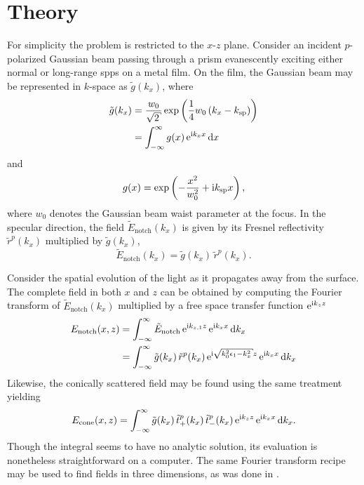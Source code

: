 \section{Theory}\label{sec:interferencetheory}
For simplicity the problem is restricted to the $x$-$z$ plane.  Consider an
incident $p$-polarized Gaussian beam passing through a prism evanescently
exciting either normal or long-range \glspl{spp} on a metal film.  On the film,
the Gaussian beam may be represented in $k$-space as $\tilde{g}(k_x)$,
where
\begin{align}
  \tilde{g}(k_x) & = \frac{w_0}{\sqrt{2}} \exp\left(\frac{1}{4}w_0\left(k_x - \ksp\right)\right) \\
                 & = \intinfty g(x)\, \me^{\mi k_x x} \md x
\end{align}
and
\begin{equation}
  g(x) = \exp\left(-\frac{x^2}{w_0^2} + {\mathrm{i}} k_\mathrm{sp} x\right),
\end{equation}
where $w_0$ denotes the Gaussian beam waist parameter at the focus.  In the
specular direction, the field $\tilde{E}_\mathrm{notch}(k_x)$ is given by its
Fresnel reflectivity $\tilde{r}^p(k_x)$ multiplied by $\tilde{g}(k_x)$,
\begin{equation}
  \tilde{E}_\mathrm{notch}(k_x)=\tilde{g}(k_x)\,\tilde{r}^p(k_x).
\end{equation}

Consider the spatial evolution of the light as it propagates
away from the surface.
The complete field in both $x$ and $z$ can be obtained by computing
the Fourier transform of $\tilde{E}_\mathrm{notch}(k_x)$ multiplied
by a free space transfer function ${\mathrm{e}}^{{\mathrm{i}} k_{z} z}$
\begin{align}
  E_\mathrm{notch}(x,z) & = \intinfty \tilde{E}_\mathrm{notch}\, \me^{\mi k_{z,1} z}\, \me^{\mi k_x x} \md k_x                                 \\
                        & = \intinfty \tilde{g}(k_x)\, \tilde{r}^p(k_x)\, \me^{\mi \sqrt{k_0^2 \epsilon_1 - k_x^2}z}\, \me^{\mi k_x x} \md k_x
  \label{eqn:fourier123}
\end{align}
Likewise, the conically scattered field may be found using the same
treatment yielding
\begin{align}
  E_\text{cone}(x,z) = \int_{-\infty}^{\infty} \tilde{g}(k_x)\,
  \tilde{t}^p_+(k_x)\, \tilde{t}^p_-(k_x)\,{\mathrm{e}}^{{\mathrm{i}} k_z z}\, {\mathrm{e}}^{{\mathrm{i}} k_x x}
  \,\mathrm{d} k_x.
  \label{eqn:fourier321}
\end{align}
Though the integral seems to have no analytic solution, its evaluation is
nonetheless straightforward on a computer.  The same Fourier transform
recipe may be used to find fields in three dimensions, as was done in
.

